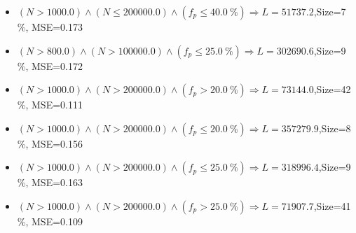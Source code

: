 \documentclass[numbered]{CSL}
\begin{document}
\begin{itemize}
\item $(N > 1000.0) \land (N \leq 200000.0) \land (f_p \leq 40.0~\%) \Rightarrow L = 51737.2$,\hfill Size=7 \%, MSE=0.173
\item $(N > 800.0) \land (N > 100000.0) \land (f_p \leq 25.0~\%) \Rightarrow L = 302690.6$,\hfill Size=9 \%, MSE=0.172
\item $(N > 1000.0) \land (N > 200000.0) \land (f_p > 20.0~\%) \Rightarrow L = 73144.0$,\hfill Size=42 \%, MSE=0.111
\item $(N > 1000.0) \land (N > 200000.0) \land (f_p \leq 20.0~\%) \Rightarrow L = 357279.9$,\hfill Size=8 \%, MSE=0.156
\item $(N > 1000.0) \land (N > 200000.0) \land (f_p \leq 25.0~\%) \Rightarrow L = 318996.4$,\hfill Size=9 \%, MSE=0.163
\item $(N > 1000.0) \land (N > 200000.0) \land (f_p > 25.0~\%) \Rightarrow L = 71907.7$,\hfill Size=41 \%, MSE=0.109
\end{itemize}
\end{document}
